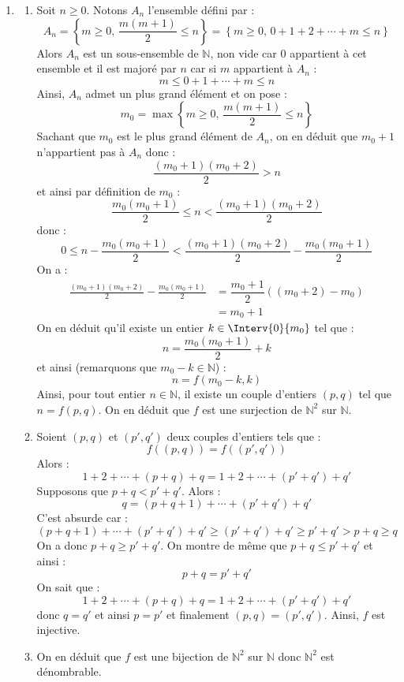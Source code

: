 \documentclass[a4paper,10pt]{report}
\begin{document}
\begin{enumerate}
\item 
\begin{enumerate}
\item Soit $n \geq 0$. Notons $A_n$ l'ensemble défini par :
$$ A_n = \left\lbrace m \geq 0, \, \frac{m(m+1)}{2} \leq n \right\rbrace = \left\lbrace m \geq 0, \, 0+1+2+ \cdots + m \leq n \right\rbrace$$
Alors $A_n$ est un sous-ensemble de $\mathbb{N}$, non vide car $0$ appartient à cet ensemble et il est majoré par $n$ car si $m$ appartient à $A_n$ :
$$ m \leq 0+1+ \cdots + m \leq n$$
Ainsi, $A_n$ admet un plus grand élément et on pose :
$$ m_0 = \max \left\lbrace m \geq 0, \, \frac{m(m+1)}{2} \leq n \right\rbrace$$
Sachant que $m_0$ est le plus grand élément de $A_n$, on en déduit que $m_0+1$ n'appartient pas à $A_n$ donc :
$$ \frac{(m_0+1)(m_0+2)}{2} > n$$
et ainsi par définition de $m_0$ :
$$ \frac{m_0(m_0+1)}{2} \leq n  <\frac{(m_0+1)(m_0+2)}{2}$$
donc :
$$   0 \leq  n- \frac{m_0(m_0+1)}{2} <\frac{(m_0+1)(m_0+2)}{2} - \frac{m_0(m_0+1)}{2}$$
On a :
\begin{align*}
\frac{(m_0+1)(m_0+2)}{2} - \frac{m_0(m_0+1)}{2} & = \dfrac{m_0+1}{2} ((m_0+2)-m_0) \\
& = m_0+1 
\end{align*}
On en déduit qu'il existe un entier $k \in \Interv{0}{m_0}$ tel que :
$$ n = \frac{m_0(m_0+1)}{2} + k$$
et ainsi (remarquons que $m_0-k \in \mathbb{N}$) : 
$$ n = f(m_0-k,k)$$
Ainsi, pour tout entier $n \in \mathbb{N}$, il existe un couple d'entiers $(p,q)$ tel que $n=f(p,q)$. On en déduit que $f$ est une surjection de $\mathbb{N}^2$ sur $\mathbb{N}$.
\item Soient $(p,q)$ et $(p',q')$ deux couples d'entiers tels que :
$$ f((p,q))=f((p',q'))$$
Alors :
$$ 1+2+ \cdots + (p+q) + q = 1+2+ \cdots + (p'+q') + q'$$
Supposons que $p+q<p'+q'$. Alors :
$$ q= (p+q+1)+ \cdots +(p'+q') + q'$$
C'est absurde car :
$$ (p+q+1)+ \cdots +(p'+q') + q' \geq (p'+q')+q' \geq p'+q'>p+q \geq q$$
On a donc $p+q \geq p'+q'$. On montre de même que $p+q \leq p'+q'$ et ainsi :
$$ p+q = p'+q'$$
On sait que :
$$  1+2+ \cdots + (p+q) + q = 1+2+ \cdots + (p'+q') + q'$$
donc $q=q'$ et ainsi $p=p'$ et finalement $(p,q)=(p',q')$. Ainsi, $f$ est injective.
\item On en déduit que $f$ est une bijection de $\mathbb{N}^2$ sur $\mathbb{N}$ donc $\mathbb{N}^2$ est dénombrable.
\end{enumerate}
\end{enumerate}




\medskip
\end{document}
